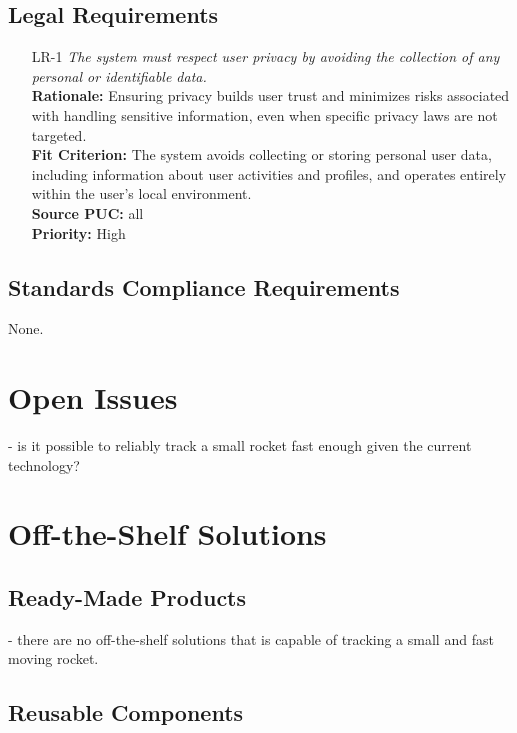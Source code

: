 \documentclass[12pt]{article}
\begin{document}
\subsection{Legal Requirements}
\begin{itemize}[leftmargin=*]
  \item[LR-1] \emph{The system must respect user privacy by avoiding the collection of
          any personal or identifiable data.}\\[2mm]
        \textbf{Rationale:} Ensuring privacy builds user trust and minimizes risks associated with handling sensitive information, even when specific privacy laws are not targeted.\\
        \textbf{Fit Criterion:} The system avoids collecting or storing personal user data, including information about user activities and profiles, and operates entirely within the user's local environment.\\
        \textbf{Source PUC:} all \\
        \textbf{Priority:} High
\end{itemize}

\subsection{Standards Compliance Requirements}

None.

\section{Open Issues}

- is it possible to reliably track a small rocket fast enough given the current technology?

\section{Off-the-Shelf Solutions}
\subsection{Ready-Made Products}

- there are no off-the-shelf solutions that is capable of tracking a small and fast moving rocket.

\subsection{Reusable Components}
\end{document}
